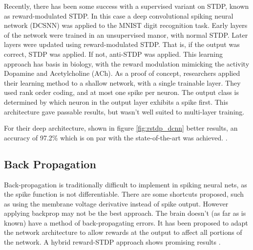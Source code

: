     Recently, there has been some success with a supervised variant on STDP,
    known as reward-modulated STDP. In this case a deep convolutional spiking
    neural network (DCSNN) was applied to the MNIST digit recognition
    task. Early layers of the network were trained in an unsupervised manor,
    with normal STDP. Later layers were updated using reward-modulated
    STDP. That is, if the output was correct, STDP was applied. If not,
    anti-STDP was applied. This learning approach has basis in biology, with the
    reward modulation mimicking the activity Dopamine and Acetylcholine
    (ACh). As a proof of concept, researchers applied their learning method to a
    shallow network, with a single trainable layer. They used rank order coding,
    and at most one spike per neuron. The output class is determined by which
    neuron in the output layer exhibits a spike first. This architecture gave
    passable results, but wasn't well suited to multi-layer training.
    
    For their deep architecture, shown in figure \ref{fig:rstdp_dcnn} better
    results, an accuracy of 97.2\% which is on par with the state-of-the-art was
    achieved. \cite{mozafari_2018}.
    
    
    
    
    \subsection{Back Propagation}
    
    Back-propagation is traditionally difficult to implement in spiking neural
    nets, as the spike function is not differentiable. There are some shortcuts
    proposed, such as using the membrane voltage derivative instead of spike
    output. However applying backprop may not be the best approach. The brain
    doesn't (as far as is known) have a method of back-propagating errors. It
    has been proposed to adapt the network architecture to allow rewards at the
    output to affect all portions of the network. A hybrid reward-STDP approach
    shows promising results \cite{tavanaei_2019}.
    
